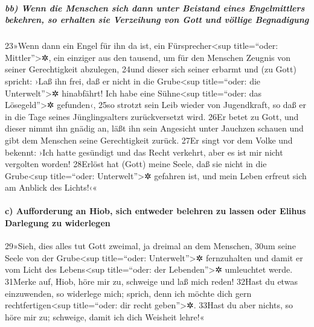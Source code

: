 \hypertarget{bb-wenn-die-menschen-sich-dann-unter-beistand-eines-engelmittlers-bekehren-so-erhalten-sie-verzeihung-von-gott-und-vuxf6llige-begnadigung}{%
\subparagraph{bb) Wenn die Menschen sich dann unter Beistand eines
Engelmittlers bekehren, so erhalten sie Verzeihung von Gott und völlige
Begnadigung}\label{bb-wenn-die-menschen-sich-dann-unter-beistand-eines-engelmittlers-bekehren-so-erhalten-sie-verzeihung-von-gott-und-vuxf6llige-begnadigung}}

23»Wenn dann ein Engel für ihn da ist, ein Fürsprecher\textless sup
title=``oder: Mittler''\textgreater✲, ein einziger aus den tausend, um
für den Menschen Zeugnis von seiner Gerechtigkeit abzulegen, 24und
dieser sich seiner erbarmt und (zu Gott) spricht: ›Laß ihn frei, daß er
nicht in die Grube\textless sup title=``oder: die
Unterwelt''\textgreater✲ hinabfährt! Ich habe eine Sühne\textless sup
title=``oder: das Lösegeld''\textgreater✲ gefunden‹, 25so strotzt sein
Leib wieder von Jugendkraft, so daß er in die Tage seines
Jünglingsalters zurückversetzt wird. 26Er betet zu Gott, und dieser
nimmt ihn gnädig an, läßt ihn sein Angesicht unter Jauchzen schauen und
gibt dem Menschen seine Gerechtigkeit zurück. 27Er singt vor dem Volke
und bekennt: ›Ich hatte gesündigt und das Recht verkehrt, aber es ist
mir nicht vergolten worden! 28Erlöst hat (Gott) meine Seele, daß sie
nicht in die Grube\textless sup title=``oder: Unterwelt''\textgreater✲
gefahren ist, und mein Leben erfreut sich am Anblick des Lichts!‹«

\hypertarget{c-aufforderung-an-hiob-sich-entweder-belehren-zu-lassen-oder-elihus-darlegung-zu-widerlegen}{%
\paragraph{c) Aufforderung an Hiob, sich entweder belehren zu lassen
oder Elihus Darlegung zu
widerlegen}\label{c-aufforderung-an-hiob-sich-entweder-belehren-zu-lassen-oder-elihus-darlegung-zu-widerlegen}}

29»Sieh, dies alles tut Gott zweimal, ja dreimal an dem Menschen, 30um
seine Seele von der Grube\textless sup title=``oder:
Unterwelt''\textgreater✲ fernzuhalten und damit er vom Licht des
Lebens\textless sup title=``oder: der Lebenden''\textgreater✲ umleuchtet
werde. 31Merke auf, Hiob, höre mir zu, schweige und laß mich reden!
32Hast du etwas einzuwenden, so widerlege mich; sprich, denn ich möchte
dich gern rechtfertigen\textless sup title=``oder: dir recht
geben''\textgreater✲. 33Hast du aber nichts, so höre mir zu; schweige,
damit ich dich Weisheit lehre!«

